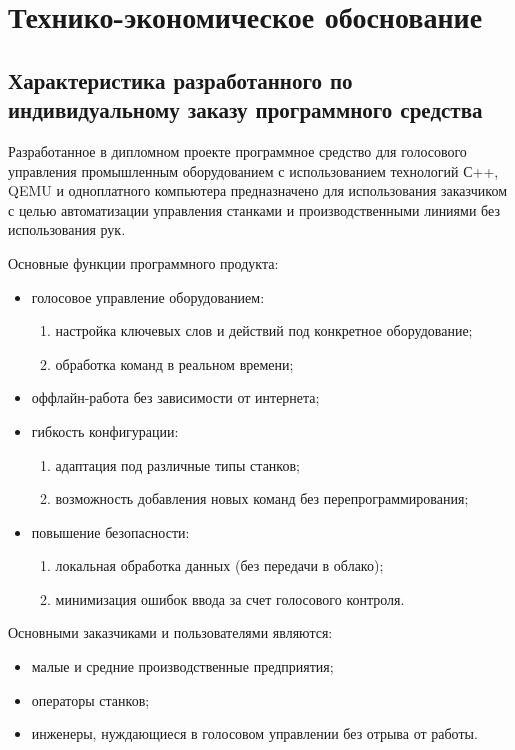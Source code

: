 \section{Технико-экономическое обоснование }

\subsection{Характеристика разработанного по индивидуальному заказу
	 программного средства}
	 
Разработанное в дипломном проекте программное средство для голосового управления промышленным оборудованием с использованием технологий С++, QEMU и одноплатного компьютера предназначено для использования заказчиком с целью автоматизации управления станками и производственными линиями без использования рук.

Основные функции программного продукта:
\begin{itemize}
	\item голосовое управление оборудованием:
	\begin{enumerate}[label=\alph*)]
		\item настройка ключевых слов и действий под конкретное оборудование;
		\item обработка команд в реальном времени;
	\end{enumerate}
	
	\item оффлайн-работа без зависимости от интернета;
	\item гибкость конфигурации:
	\begin{enumerate}[label=\alph*)]
		\item адаптация под различные типы станков;
		\item возможность добавления новых команд без перепрограммирования;
	\end{enumerate}
	
	\item повышение безопасности:
	\begin{enumerate}[label=\alph*)]
		\item локальная обработка данных (без передачи в облако);
		\item минимизация ошибок ввода за счет голосового контроля.
	\end{enumerate}
\end{itemize}

Основными заказчиками и пользователями являются:
\begin{itemize}
	\item малые и средние производственные предприятия;
	\item операторы станков;
	\item инженеры, нуждающиеся в голосовом управлении без отрыва от работы.
\end{itemize}


